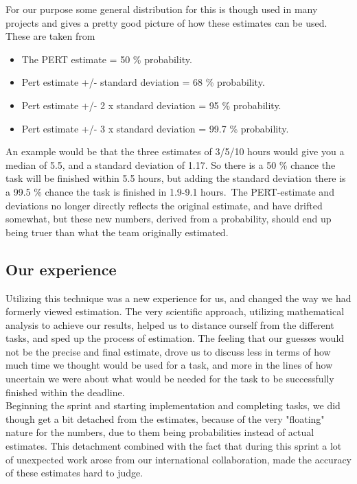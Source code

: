 For our purpose some general distribution for this is though used in many projects and gives a pretty good picture of how these estimates can be used. These are taken from \cite{3point_w}\
\begin{itemize}

\item The PERT estimate = 50 \% probability.
\item Pert estimate +/- standard deviation = 68 \% probability.
\item Pert estimate +/- 2 x standard deviation = 95 \% probability.
\item Pert estimate +/- 3 x standard deviation = 99.7 \% probability.
\end{itemize}
An example would be that the three estimates of 3/5/10 hours would give you a median of 5.5, and a standard deviation of 1.17. So there is a 50 \% chance the task will be finished within 5.5 hours, but adding the standard deviation there is a 99.5 \% chance the task is finished in 1.9-9.1 hours.\
The PERT-estimate and deviations no longer directly reflects the original estimate, and have drifted somewhat, but these new numbers, derived from a probability, should end up being truer than what the team originally estimated. \\



\subsection{Our experience}
Utilizing this technique was a new experience for us, and changed the way we had formerly viewed estimation. The very scientific approach, utilizing mathematical analysis to achieve our results, helped us to distance ourself from the different tasks, and sped up the process of estimation. The feeling that our guesses would not be the precise and final estimate, drove us to discuss less in terms of how much time we thought would be used for a task, and more in the lines of how uncertain we were about what would be needed for the task to be successfully finished within the deadline. \\

Beginning the sprint and starting implementation and completing tasks, we did though get a bit detached from the estimates, because of the very "floating" nature for the numbers, due to them being probabilities instead of actual estimates. This detachment combined with the fact that during this sprint a lot of unexpected work arose from our international collaboration, made the accuracy of these estimates hard to judge. \\


